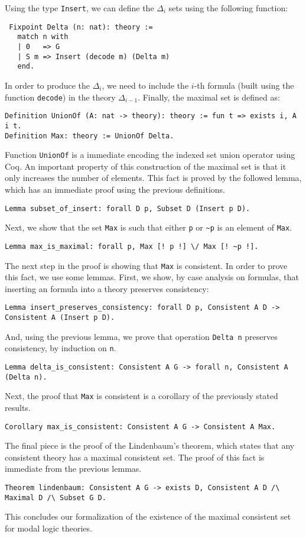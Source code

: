 \documentclass[3p,times]{elsarticle}
\begin{document}
Using the type \texttt{Insert}, we can define the $\Delta_{i}$ sets using the
following function:

\begin{verbatim}
 Fixpoint Delta (n: nat): theory :=
   match n with
   | 0   => G
   | S m => Insert (decode m) (Delta m)
   end.
\end{verbatim}

In order to produce the $\Delta_{i}$, we need to include the $i$-th formula (built using the function \texttt{decode})
in the theory $\Delta_{i - 1}$. Finally, the maximal set is defined as:
\begin{verbatim}
Definition UnionOf (A: nat -> theory): theory := fun t => exists i, A i t.
Definition Max: theory := UnionOf Delta.
\end{verbatim}
Function \texttt{UnionOf} is a immediate encoding the indexed set union operator using Coq. An important property
of this construction of the maximal set is that it only increases the number of elements. This fact is proved by
the followed lemma, which has an immediate proof using the previous definitions.
\begin{verbatim}
Lemma subset_of_insert: forall D p, Subset D (Insert p D).
\end{verbatim}
Next, we show that the set \texttt{Max} is such that either \verb|p| or \verb|~p| is an element of \verb|Max|.
\begin{verbatim}
Lemma max_is_maximal: forall p, Max [! p !] \/ Max [! ~p !].
\end{verbatim}
The next step in the proof is showing that \texttt{Max} is consistent. In order to prove this fact,
we use some lemmas. First, we show, by case analysis on formulas, that inserting an formula into a theory
preserves consistency:
\begin{verbatim}
Lemma insert_preserves_consistency: forall D p, Consistent A D -> Consistent A (Insert p D).
\end{verbatim}
And, using the previous lemma, we prove that operation \texttt{Delta n} preserves consistency, by induction on \verb|n|.
\begin{verbatim}
Lemma delta_is_consistent: Consistent A G -> forall n, Consistent A (Delta n).
\end{verbatim}
Next, the proof that \texttt{Max} is consistent is a corollary of the previously stated results.
\begin{verbatim}
Corollary max_is_consistent: Consistent A G -> Consistent A Max.
\end{verbatim}
The final piece is the proof of the Lindenbaum's theorem, which states that any consistent theory has
a maximal consistent set. The proof of this fact is immediate from the previous lemmas.
\begin{verbatim}
Theorem lindenbaum: Consistent A G -> exists D, Consistent A D /\ Maximal D /\ Subset G D.
\end{verbatim}
This concludes our formalization of the existence of the maximal consistent set for modal logic theories.
\end{document}
